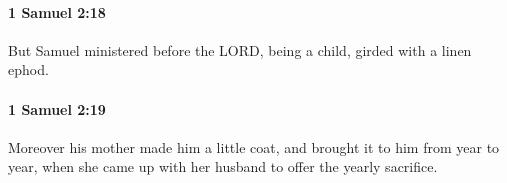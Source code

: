 		\paragraph{1 Samuel 2:18} %
			\label{1SAMUEL-2-18}

			But Samuel ministered before the LORD, being a child, girded with a linen ephod.


		\paragraph{1 Samuel 2:19} %
			\label{1SAMUEL-2-19}

			Moreover his mother made him a little coat, and brought it to him from year to year, when she came up with her husband to offer the yearly sacrifice.


